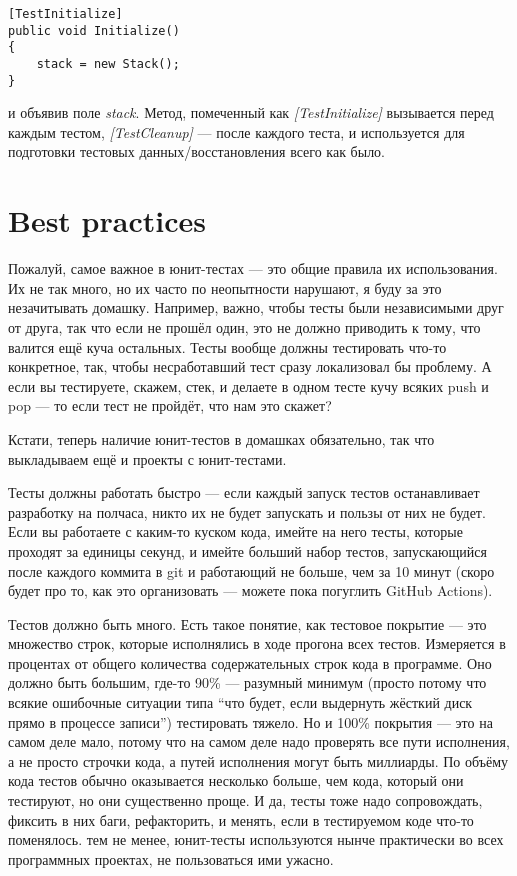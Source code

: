 \documentclass{../../text-style}
\begin{document}
\begin{verbatim}
[TestInitialize]
public void Initialize()
{
    stack = new Stack();
}
\end{verbatim}

и объявив поле \textit{stack}. Метод, помеченный как \textit{[TestInitialize]} вызывается перед каждым тестом, \textit{[TestCleanup]} --- после каждого теста, и используется для подготовки тестовых данных/восстановления всего как было. 

\section{Best practices}

Пожалуй, самое важное в юнит-тестах --- это общие правила их использования. Их не так много, но их часто по неопытности нарушают, я буду за это незачитывать домашку. Например, важно, чтобы тесты были независимыми друг от друга, так что если не прошёл один, это не должно приводить к тому, что валится ещё куча остальных. Тесты вообще должны тестировать что-то конкретное, так, чтобы несработавший тест сразу локализовал бы проблему. А если вы тестируете, скажем, стек, и делаете в одном тесте кучу всяких push и pop --- то если тест не пройдёт, что нам это скажет?

Кстати, теперь наличие юнит-тестов в домашках обязательно, так что выкладываем ещё и проекты с юнит-тестами.

Тесты должны работать быстро --- если каждый запуск тестов останавливает разработку на полчаса, никто их не будет запускать и пользы от них не будет. Если вы работаете с каким-то куском кода, имейте на него тесты, которые проходят за единицы секунд, и имейте больший набор тестов, запускающийся после каждого коммита в git и работающий не больше, чем за 10 минут (скоро будет про то, как это организовать --- можете пока погуглить GitHub Actions).

Тестов должно быть много. Есть такое понятие, как тестовое покрытие --- это множество строк, которые исполнялись в ходе прогона всех тестов. Измеряется в процентах от общего количества содержательных строк кода в программе. Оно должно быть большим, где-то 90\% --- разумный минимум (просто потому что всякие ошибочные ситуации типа \enquote{что будет, если выдернуть жёсткий диск прямо в процессе записи}) тестировать тяжело. Но и 100\% покрытия --- это на самом деле мало, потому что на самом деле надо проверять все пути исполнения, а не просто строчки кода, а путей исполнения могут быть миллиарды. По объёму кода тестов обычно оказывается несколько больше, чем кода, который они тестируют, но они существенно проще. И да, тесты тоже надо сопровождать, фиксить в них баги, рефакторить, и менять, если в тестируемом коде что-то поменялось. тем не менее, юнит-тесты используются нынче практически во всех программных проектах, не пользоваться ими ужасно.
\end{document}
